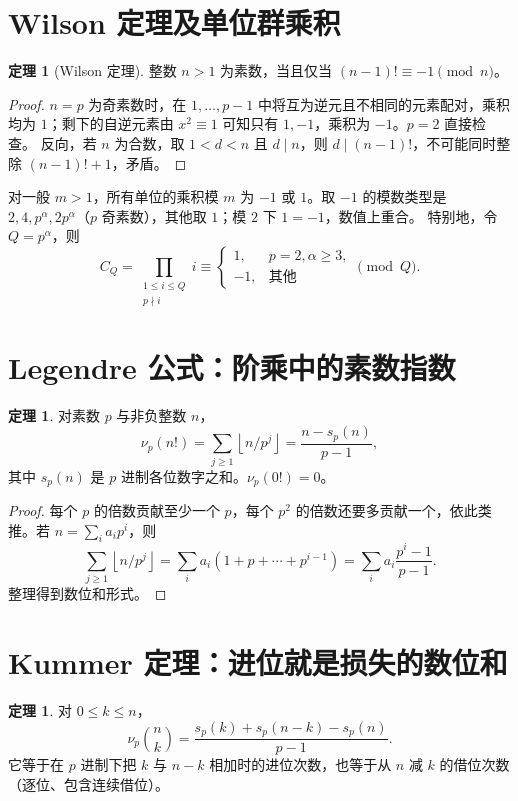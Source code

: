 \documentclass[UTF8,a4paper,11pt,oneside,openany,fontset=fandol]{ctexbook}
\theoremstyle{definition}
\newtheorem{theorem}[definition]{定理}
\newcommand{\floor}[1]{\left\lfloor #1\right\rfloor}
\begin{document}
\section{Wilson 定理及单位群乘积}
\begin{theorem}[Wilson 定理]
整数 $n>1$ 为素数，当且仅当 $(n-1)!\equiv-1\pmod n$。
\end{theorem}
\begin{proof}
$n=p$ 为奇素数时，在 $1,\ldots,p-1$ 中将互为逆元且不相同的元素配对，乘积均为 $1$；剩下的自逆元素由 $x^2\equiv1$ 可知只有 $1,-1$，乘积为 $-1$。$p=2$ 直接检查。
反向，若 $n$ 为合数，取 $1<d<n$ 且 $d\mid n$，则 $d\mid(n-1)!$，不可能同时整除 $(n-1)!+1$，矛盾。
\end{proof}
对一般 $m>1$，所有单位的乘积模 $m$ 为 $-1$ 或 $1$。取 $-1$ 的模数类型是 $2,4,p^\alpha,2p^\alpha$（$p$ 奇素数），其他取 $1$；模 $2$ 下 $1=-1$，数值上重合。
特别地，令 $Q=p^\alpha$，则
\[
 C_Q=\prod_{\substack{1\le i\le Q\\p\nmid i}}i\equiv
 \begin{cases}1,&p=2,\alpha\ge3,\\-1,&\text{其他}\end{cases}\pmod Q.
\]



\section{Legendre 公式：阶乘中的素数指数}
\begin{theorem}
对素数 $p$ 与非负整数 $n$，
\[
 \nu_p(n!)=\sum_{j\ge1}\floor{n/p^j}
 =\frac{n-s_p(n)}{p-1},
\]
其中 $s_p(n)$ 是 $p$ 进制各位数字之和。$\nu_p(0!)=0$。
\end{theorem}
\begin{proof}
每个 $p$ 的倍数贡献至少一个 $p$，每个 $p^2$ 的倍数还要多贡献一个，依此类推。若 $n=\sum_i a_ip^i$，则
\[
\sum_{j\ge1}\floor{n/p^j}
=\sum_i a_i(1+p+\cdots+p^{i-1})
=\sum_i a_i\frac{p^i-1}{p-1}.
\]
整理得到数位和形式。
\end{proof}


\section{Kummer 定理：进位就是损失的数位和}
\begin{theorem}
对 $0\le k\le n$，
\[
\nu_p\binom nk=\frac{s_p(k)+s_p(n-k)-s_p(n)}{p-1}.
\]
它等于在 $p$ 进制下把 $k$ 与 $n-k$ 相加时的进位次数，也等于从 $n$ 减 $k$ 的借位次数（逐位、包含连续借位）。
\end{theorem}
\end{document}
